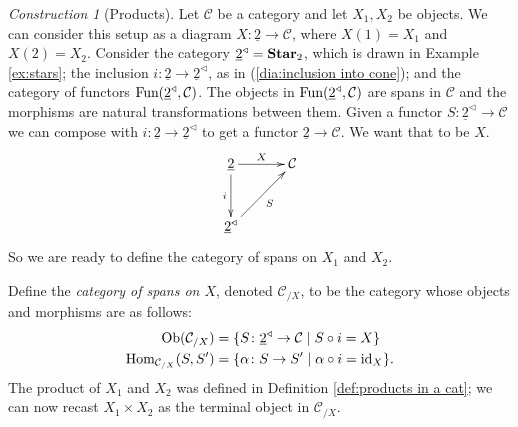 \documentclass{book}
\def\tn{\textnormal}
\def\mc{\mathcal}
\def\Hom{\tn{Hom}}
\def\Fun{\tn{Fun}}
\def\Ob{\tn{Ob}}
\def\lcone{^\triangleleft}
\def\to{\rightarrow}
\def\taking{\colon}
\def\|{{\;|\;}}
\def\ul{\underline}
\def\id{\tn{id}}
\def\Star{{\bf Star}}
\def\mcC{\mc{C}}
\theoremstyle{remark}
\newtheorem{construction}[subsubsection]{Construction}
\theoremstyle{definition}
\begin{document}
\begin{construction}[Products]

Let $\mcC$ be a category and let $X_1,X_2$ be objects. We can consider this setup as a diagram $X\taking\ul{2}\to\mcC$, where $X(1)=X_1$ and $X(2)=X_2$. Consider the category $\ul{2}\lcone=\Star_2$, which is drawn in Example \ref{ex:stars}; the inclusion $i\taking\ul{2}\to\ul{2}\lcone$, as in (\ref{dia:inclusion into cone}); and the category of functors $\Fun(\ul{2}\lcone,\mcC)$. The objects in $\Fun(\ul{2}\lcone,\mcC)$ are spans in $\mcC$ and the morphisms are natural transformations between them. Given a functor $S\taking\ul{2}\lcone\to\mcC$ we can compose with $i\taking\ul{2}\to\ul{2}\lcone$ to get a functor $\ul{2}\to\mcC$. We want that to be $X$.
$$\xymatrix@=30pt{\ul{2}\ar[r]^{X}\ar[d]_i&\mcC\\\ul{2}\lcone\ar[ur]_S}$$
So we are ready to define the category of spans on $X_1$ and $X_2$.

Define the {\em category of spans on $X$}, denoted $\mcC_{/X}$, to be the category whose objects and morphisms are as follows:
\begin{align}\label{dia:slice for products}
\Ob(\mcC_{/X})&=\{S\taking\ul{2}\lcone\to\mcC\|S\circ i=X\}\\
\nonumber\Hom_{\mcC_{/X}}(S,S')&=\{\alpha\taking S\to S'\|\alpha\circ i=\id_X\}.
\end{align}
The product of $X_1$ and $X_2$ was defined in Definition \ref{def:products in a cat}; we can now recast $X_1\times X_2$ as the terminal object in $\mcC_{/X}$.


\end{construction}
\end{document}
